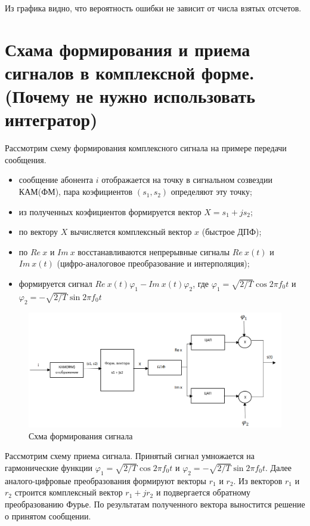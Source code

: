 	Из графика видно, что вероятность ошибки не зависит от числа взятых отсчетов.
	
	\section{Схама формирования и приема сигналов в комплексной форме. (Почему не нужно использовать интегратор)}
	Рассмотрим схему формирования комплексного сигнала на примере передачи сообщения.
	
	\begin{itemize}
		\item сообщение абонента $i$ отображается на точку в сигнальном созвездии КАМ(ФМ), пара коэфициентов $(s_1,s_2)$ определяют эту точку;
		\item из полученных коэфициентов формируется вектор $X=s_1+js_2$;
		\item по вектору $X$ вычисляется комплексный вектор $x$ (быстрое ДПФ);
		\item по $Re\ x$ и $Im\ x$ восстанавливаются непрерывные сигналы $Re\ x(t)$ и $Im\ x(t)$ (цифро-аналоговое преобразование и интерполяция);
		\item формируется сигнал $Re\ x(t)\varphi_1-Im\ x(t)\varphi_2$, где $\varphi_1=\sqrt{2/T}\cos2\pi f_0t$ и  $\varphi_2=-\sqrt{2/T}\sin2\pi f_0t$
	\end{itemize}
	
	\begin{figure}[h]
		\centering
		\includegraphics[scale=0.4]{img/Glebov_2.png}
		\caption{Схма формирования сигнала}
		\label{Glebov.image3}
	\end{figure}
	Рассмотрим схему приема сигнала. Принятый сигнал умножается на гармонические функции 
	$\varphi_1=\sqrt{2/T}\cos2\pi f_0t$ и $\varphi_2=-\sqrt{2/T}\sin2\pi f_0t$. 
	Далее аналого-цифровые преобразования формируют векторы $r_1$ и $r_2$. 
	Из векторов $r_1$ и $r_2$ строится комплексный вектор $r_1+jr_2$ и подвергается обратному преобразованию Фурье. 
	По результатам полученного вектора выностится решение о принятом сообщении.
	
